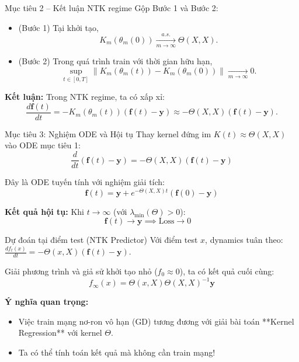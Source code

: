 \begin{frame}{Mục tiêu 2 – Kết luận NTK regime}
  Gộp Bước 1 và Bước 2:
  \begin{itemize}
    \item (Bước 1) Tại khởi tạo,
      \[
        K_m(\theta_m(0)) \xrightarrow[m\to\infty]{a.s.} \Theta(X,X).
      \]
    \item (Bước 2) Trong quá trình train với thời gian hữu hạn,
      \[
        \sup_{t\in[0,T]}
        \|K_m(\theta_m(t)) - K_m(\theta_m(0))\|
        \xrightarrow[m\to\infty]{} 0.
      \]
  \end{itemize}

  \vspace{0.2cm}
  \textbf{Kết luận:} Trong NTK regime, ta có xấp xỉ:
  \[
    \frac{d\mathbf f(t)}{dt}
      = -K_m(\theta_m(t))(\mathbf f(t)-\mathbf y)
      \approx -\Theta(X,X)(\mathbf f(t)-\mathbf y).
  \]
\end{frame}

\begin{frame}{Mục tiêu 3: Nghiệm ODE và Hội tụ}
  Thay kernel đứng im $K(t) \approx \Theta(X,X)$ vào ODE mục tiêu 1:
  \[ \frac{d}{dt}(\mathbf{f}(t) - \mathbf{y}) = -\Theta(X,X)(\mathbf{f}(t) - \mathbf{y}) \]
  
  Đây là ODE tuyến tính với nghiệm giải tích:
  \[ \mathbf{f}(t) = \mathbf{y} + e^{-\Theta(X,X)t}(\mathbf{f}(0) - \mathbf{y}) \]
  
  \textbf{Kết quả hội tụ:} Khi $t \to \infty$ (với $\lambda_{\min}(\Theta) > 0$):
  \[ \mathbf{f}(t) \to \mathbf{y} \implies \text{Loss} \to 0 \quad \]
\end{frame}

\begin{frame}{Dự đoán tại điểm test (NTK Predictor)}
  Với điểm test $x$, dynamics tuân theo: $\frac{df_t(x)}{dt} = -\Theta(x,X)(\mathbf f(t) - \mathbf y)$.
  
  Giải phương trình và giả sử khởi tạo nhỏ ($f_0 \approx 0$), ta có kết quả cuối cùng:
  \[
    \boxed{ f_\infty(x) = \Theta(x,X)\Theta(X,X)^{-1}\mathbf y }
  \]

  \textbf{Ý nghĩa quan trọng:}
  \begin{itemize}
    \item Việc train mạng nơ-ron vô hạn (GD) tương đương với giải bài toán **Kernel Regression** với kernel $\Theta$.
    \item Ta có thể tính toán kết quả mà không cần train mạng!
  \end{itemize}
\end{frame}

